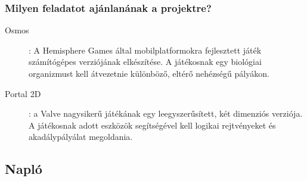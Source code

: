 		\subsubsection*{Milyen feladatot ajánlanának a projektre?}
		\begin{description}
\item[Osmos]: A Hemisphere Games által mobilplatformokra fejlesztett játék számítógépes verziójának elkészítése. A játékosnak egy biológiai organizmust kell átvezetnie különböző, eltérő nehézségű pályákon.

\item[Portal 2D]: a Valve nagysikerű játékának egy leegyszerűsített, két dimenziós verziója. A játékosnak adott eszközök segítségével kell logikai rejtvényeket és akadálypályálat megoldania.		
        \end{description}
	\subsection{Napló}

